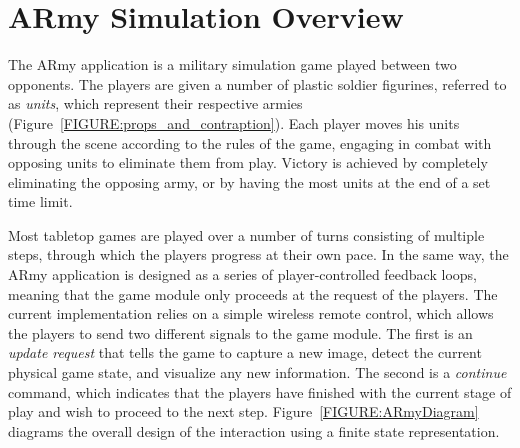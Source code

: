 \documentclass[review]{vgtc}                 %
\begin{document}





\section{ARmy Simulation Overview}

The ARmy application is a military simulation game played between two
opponents.  The players are given a number of plastic soldier
figurines, referred to as \emph{units}, which represent their
respective armies (Figure~\ref{FIGURE:props_and_contraption}).  Each
player moves his units through the scene according to the rules of the
game, engaging in combat with opposing units to eliminate them from
play.  Victory is achieved by completely eliminating the opposing
army, or by having the most units at the end of a set time limit.



Most tabletop games are played over a number of turns consisting of
multiple steps, through which the players progress at their own pace.
In the same way, the ARmy application is designed as a series of
player-controlled feedback loops, meaning that the game module only
proceeds at the request of the players.  The current implementation
relies on a simple wireless remote control, which allows the players
to send two different signals to the game module.  The first is an
{\em update request} that tells the game to capture a new image, 
detect the current physical game state, and
visualize any new information.
The second is a {\em continue} command, which indicates that the
players have finished with the current stage of play and wish to
proceed to the next step.  Figure~\ref{FIGURE:ARmyDiagram} diagrams
the overall design of the interaction using a finite state
representation.
\end{document}
